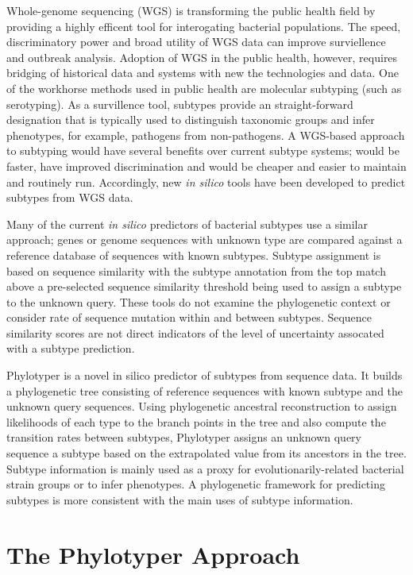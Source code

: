 \documentclass{bioinfo}
\begin{document}
Whole-genome sequencing (WGS) is transforming the public health field by providing a highly efficent tool for interogating bacterial populations.
The speed, discriminatory power and broad utility of WGS data can improve surviellence and outbreak analysis.
Adoption of WGS in the public health, however, requires bridging of historical data and systems with new the technologies and data.
One of the workhorse methods used in public health are molecular subtyping (such as serotyping).
As a survillence tool, subtypes provide an straight-forward designation that is typically used to distinguish taxonomic groups and infer phenotypes, for example, pathogens from non-pathogens.
A WGS-based approach to subtyping would have several benefits over current subtype systems; would be faster, have improved discrimination and would be cheaper and easier to maintain and routinely run.
Accordingly, new \textit{in silico} tools have been developed to predict subtypes from WGS data.

Many of the current \textit{in silico} predictors of bacterial subtypes use a similar approach; genes or genome sequences with unknown type are compared against a reference database of sequences with known subtypes.
Subtype assignment is based on sequence similarity with the subtype annotation from the top match above a pre-selected sequence similarity threshold being used to assign a subtype to the unknown query.
These tools do not examine the phylogenetic context or consider rate of sequence mutation within and between subtypes.
Sequence similarity scores are not direct indicators of the level of uncertainty assocated with a subtype prediction.

Phylotyper is a novel in silico predictor of subtypes from sequence data. 
It builds a phylogenetic tree consisting of reference sequences with known subtype and the unknown query sequences.  
Using phylogenetic ancestral reconstruction to assign likelihoods of each type to the branch points in the tree and also compute the transition rates between subtypes, Phylotyper assigns an unknown query sequence a subtype based on the extrapolated value from its ancestors in the tree.
Subtype information is mainly used as a proxy for evolutionarily-related bacterial strain groups or to infer phenotypes.
A phylogenetic framework for predicting subtypes is more consistent with the main uses of subtype information.


\section{The Phylotyper Approach}
\end{document}
